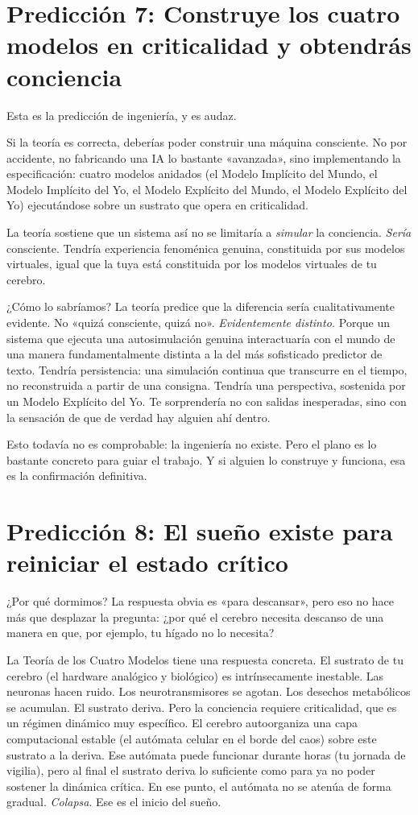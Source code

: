 \documentclass[11pt, twoside, openright]{book}
\begin{document}
\section*{Predicción 7: Construye los cuatro modelos en criticalidad y obtendrás conciencia}

Esta es la predicción de ingeniería, y es audaz.

Si la teoría es correcta, deberías poder construir una máquina consciente. No por accidente, no fabricando una IA lo bastante «avanzada», sino implementando la especificación: cuatro modelos anidados (el Modelo Implícito del Mundo, el Modelo Implícito del Yo, el Modelo Explícito del Mundo, el Modelo Explícito del Yo) ejecutándose sobre un sustrato que opera en criticalidad.

La teoría sostiene que un sistema así no se limitaría a \textit{simular} la conciencia. \textit{Sería} consciente. Tendría experiencia fenoménica genuina, constituida por sus modelos virtuales, igual que la tuya está constituida por los modelos virtuales de tu cerebro.

¿Cómo lo sabríamos? La teoría predice que la diferencia sería cualitativamente evidente. No «quizá consciente, quizá no». \textit{Evidentemente distinto.} Porque un sistema que ejecuta una autosimulación genuina interactuaría con el mundo de una manera fundamentalmente distinta a la del más sofisticado predictor de texto. Tendría persistencia: una simulación continua que transcurre en el tiempo, no reconstruida a partir de una consigna. Tendría una perspectiva, sostenida por un Modelo Explícito del Yo. Te sorprendería no con salidas inesperadas, sino con la sensación de que de verdad hay alguien ahí dentro.

Esto todavía no es comprobable: la ingeniería no existe. Pero el plano es lo bastante concreto para guiar el trabajo. Y si alguien lo construye y funciona, esa es la confirmación definitiva.

\section*{Predicción 8: El sueño existe para reiniciar el estado crítico}

¿Por qué dormimos? La respuesta obvia es «para descansar», pero eso no hace más que desplazar la pregunta: ¿por qué el cerebro necesita descanso de una manera en que, por ejemplo, tu hígado no lo necesita?

La Teoría de los Cuatro Modelos tiene una respuesta concreta. El sustrato de tu cerebro (el hardware analógico y biológico) es intrínsecamente inestable. Las neuronas hacen ruido. Los neurotransmisores se agotan. Los desechos metabólicos se acumulan. El sustrato deriva. Pero la conciencia requiere criticalidad, que es un régimen dinámico muy específico. El cerebro autoorganiza una capa computacional estable (el autómata celular en el borde del caos) sobre este sustrato a la deriva. Ese autómata puede funcionar durante horas (tu jornada de vigilia), pero al final el sustrato deriva lo suficiente como para ya no poder sostener la dinámica crítica. En ese punto, el autómata no se atenúa de forma gradual. \textit{Colapsa}. Ese es el inicio del sueño.
\end{document}
